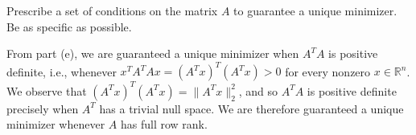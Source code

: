 Prescribe a set of conditions on the matrix $A$ to guarantee a unique minimizer. Be as specific as possible.

\begin{solution}
  From part (e), we are guaranteed a unique minimizer when $A^T A$ is positive definite, i.e., whenever 
  $x^T A^T A x = (A^T x)^T (A^T x) > 0$ for every nonzero $x \in \mathbb{R}^n$. We observe that 
  $(A^T x)^T (A^T x) = \lVert A^T x \rVert^2_2$, and so $A^T A$ is positive definite precisely when $A^T$ has a trivial
  null space. We are therefore guaranteed a unique minimizer whenever $A$ has full row rank.
  \ \\
\end{solution}
